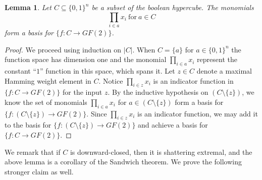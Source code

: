 \documentclass[11pt]{article}
\newtheorem{lemma}[theorem]{Lemma}
\theoremstyle{definition}
\newcommand{\1}{\mathbf{1}}
\begin{document}
\begin{lemma}\label{basis1} Let $C \subseteq \{0,1\}^n$ be a subset of the boolean hypercube. The monomials \[\displaystyle \prod_{i \in a} x_i \ \mathrm{for}\ a \in C\] form a basis for $\{f:C\to GF(2)\}$.
\end{lemma}
\begin{proof} We proceed using induction on $|C|$.  When $C = \{a\}$ for $a \in \{0,1\}^n$ the function space has dimension one and the monomial $\prod_{i \in a} x_i$ represent the constant ``$1$'' function in this space, which spans it.  Let $z \in C$ denote a maximal Hamming weight element in $C$.   Notice $\prod_{i \in z} x_i$ is an indicator function  in $\{f:C \to GF(2)\}$ for the input $z$.  By the inductive hypothesis on $(C \setminus \{z\})$, we know the set of monomials $\prod_{i \in a} x_i$ for $a \in (C \setminus \{z\})$ form a basis for $\{f:(C \setminus \{z\})\to GF(2)\}$.  Since $\prod_{i \in z} x_i$ is an indicator function, we may add it to the basis for $\{f:(C \setminus \{z\})\to GF(2)\}$ and achieve a basis for $\{f:C \to GF(2)\}$.
 \end{proof}
We remark that if $C$ is downward-closed, then it is shattering extremal, and the above lemma is a corollary of the Sandwich theorem.  %
We prove the following stronger claim as well.  
 
\end{document}
